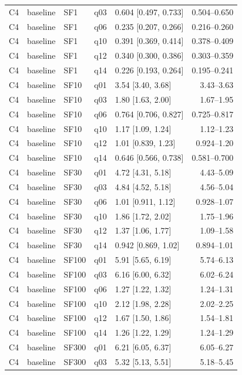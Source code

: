 \begin{longtable}{lllllr}
C4 & baseline & SF1 & q03 & 0.604 [0.497, 0.733] & 0.504--0.650 \\
C4 & baseline & SF1 & q06 & 0.235 [0.207, 0.266] & 0.216--0.260 \\
C4 & baseline & SF1 & q10 & 0.391 [0.369, 0.414] & 0.378--0.409 \\
C4 & baseline & SF1 & q12 & 0.340 [0.300, 0.386] & 0.303--0.359 \\
C4 & baseline & SF1 & q14 & 0.226 [0.193, 0.264] & 0.195--0.241 \\
C4 & baseline & SF10 & q01 & 3.54 [3.40, 3.68] & 3.43--3.63 \\
C4 & baseline & SF10 & q03 & 1.80 [1.63, 2.00] & 1.67--1.95 \\
C4 & baseline & SF10 & q06 & 0.764 [0.706, 0.827] & 0.725--0.817 \\
C4 & baseline & SF10 & q10 & 1.17 [1.09, 1.24] & 1.12--1.23 \\
C4 & baseline & SF10 & q12 & 1.01 [0.839, 1.23] & 0.924--1.20 \\
C4 & baseline & SF10 & q14 & 0.646 [0.566, 0.738] & 0.581--0.700 \\
C4 & baseline & SF30 & q01 & 4.72 [4.31, 5.18] & 4.43--5.09 \\
C4 & baseline & SF30 & q03 & 4.84 [4.52, 5.18] & 4.56--5.04 \\
C4 & baseline & SF30 & q06 & 1.01 [0.911, 1.12] & 0.928--1.07 \\
C4 & baseline & SF30 & q10 & 1.86 [1.72, 2.02] & 1.75--1.96 \\
C4 & baseline & SF30 & q12 & 1.37 [1.06, 1.77] & 1.09--1.58 \\
C4 & baseline & SF30 & q14 & 0.942 [0.869, 1.02] & 0.894--1.01 \\
C4 & baseline & SF100 & q01 & 5.91 [5.65, 6.19] & 5.74--6.13 \\
C4 & baseline & SF100 & q03 & 6.16 [6.00, 6.32] & 6.02--6.24 \\
C4 & baseline & SF100 & q06 & 1.27 [1.22, 1.32] & 1.24--1.31 \\
C4 & baseline & SF100 & q10 & 2.12 [1.98, 2.28] & 2.02--2.25 \\
C4 & baseline & SF100 & q12 & 1.67 [1.50, 1.86] & 1.54--1.81 \\
C4 & baseline & SF100 & q14 & 1.26 [1.22, 1.29] & 1.24--1.29 \\
C4 & baseline & SF300 & q01 & 6.21 [6.05, 6.37] & 6.05--6.27 \\
C4 & baseline & SF300 & q03 & 5.32 [5.13, 5.51] & 5.18--5.45 \\

\end{longtable}
